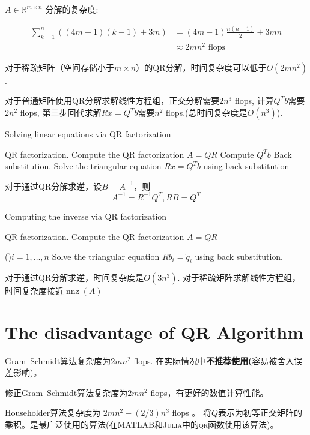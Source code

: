 $ A \in \mathbb{R}^{m \times n} $ 分解的复杂度:

$$ \begin{aligned} \sum_{k=1}^{n}((4 m-1)(k-1)+3 m) &=(4 m-1) \frac{n(n-1)}{2}+3 m n \\ & \approx 2 m n^{2} \text { flops } \end{aligned} $$

对于稀疏矩阵（空间存储小于$m \times n$）的QR分解，时间复杂度可以低于$O(2mn^2)$. 

对于普通矩阵使用QR分解求解线性方程组，正交分解需要$2 n^3$ flops, 计算$Q^T b$需要$2n^2$ flops, 第三步回代求解$Rx = Q^Tb$需要$n^2$ flops.(总时间复杂度是$O(n^3)$). 

\begin{algorithm}[htbp]
    \caption{Solving linear equations via QR factorization}
    QR factorization. Compute the QR factorization $ A=Q R $\;
    Compute $ Q^{T} b $\;
    Back substitution. Solve the triangular equation $ R x=Q^{T} b $ using back substitution\;
\end{algorithm}

\begin{theorem}
    对于通过QR分解求逆，设$ B=A^{-1} $，则$$ A^{-1}=R^{-1} Q^{T}, RB = Q^T $$
\end{theorem}


\begin{algorithm}[htbp]
    \caption{Computing the inverse via QR factorization}

    QR factorization. Compute the QR factorization $ A=Q R $\;

    \For(){$ i=1, \ldots, n $}{
        Solve the triangular equation $ R b_{i}=\tilde{q}_{i} $ using back substitution.
    }
\end{algorithm}

对于通过QR分解求逆，时间复杂度是$O(3n^3)$. 对于稀疏矩阵求解线性方程组，时间复杂度接近$\operatorname{nnz}(A)$

\section{The disadvantage of QR Algorithm}

Gram–Schmidt算法复杂度为$2mn^2$ flops. 在实际情况中\textbf{不推荐使用(}容易被舍入误差影响)。

修正Gram–Schmidt算法复杂度为$2mn^2$ flops，有更好的数值计算性能。

Householder算法复杂度为 $ 2 m n^{2}-(2 / 3) n^{3} $ flops 。
将$Q$表示为初等正交矩阵的乘积。是最广泛使用的算法(在\textsc{MATLAB}和\textsc{Julia}中的\textsc{qr}函数使用该算法)。

